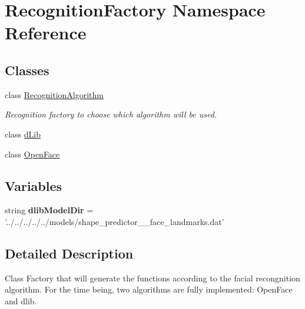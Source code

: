 \hypertarget{namespaceRecognitionFactory}{\section{Recognition\-Factory Namespace Reference}
\label{namespaceRecognitionFactory}
}
\subsection*{Classes}
\begin{DoxyCompactItemize}
\item 
class \hyperlink{classRecognitionFactory_1_1RecognitionAlgorithm}{Recognition\-Algorithm}
\begin{DoxyCompactList}\small\item\em Recognition factory to choose which algorithm will be used. \end{DoxyCompactList}\item 
class \hyperlink{classRecognitionFactory_1_1dLib}{d\-Lib}
\item 
class \hyperlink{classRecognitionFactory_1_1OpenFace}{Open\-Face}
\end{DoxyCompactItemize}
\subsection*{Variables}
\begin{DoxyCompactItemize}
\item 
\hypertarget{namespaceRecognitionFactory_ade440dc4b1ebeeb99bbf9123682c441b}{string {\bfseries dlib\-Model\-Dir} = '../../../../../models/shape\-\_\-predictor\-\_\-\_\-face\-\_\-landmarks.\-dat'}\label{namespaceRecognitionFactory_ade440dc4b1ebeeb99bbf9123682c441b}

\end{DoxyCompactItemize}


\subsection{Detailed Description}
\begin{DoxyVerb}Class Factory that will generate the functions according to the facial recongnition algorithm.
For the time being, two algorithms are fully implemented: OpenFace and dlib.
\end{DoxyVerb}
 
